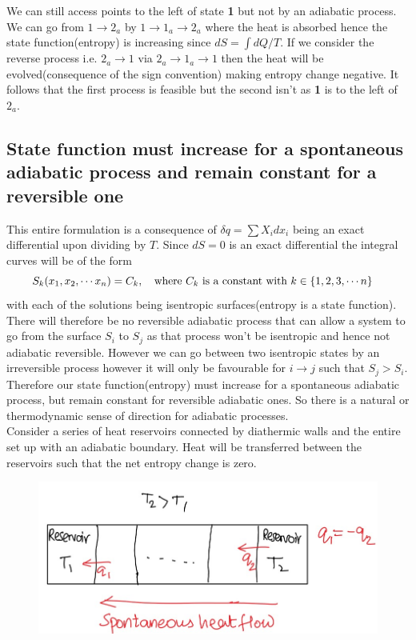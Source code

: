 \documentclass[12pt]{article}
\begin{document}
We can still access points to the left of state \textbf{1} but not by an adiabatic process. We can go from $1\to 2_a$ by $1\to 1_a \to 2_a$ where the heat is absorbed hence the state function(entropy) is increasing since $dS=\int dQ/T$. If we consider the reverse process i.e. $2_a\to 1$ via $2_a\to 1_a\to 1$ then the heat will be evolved(consequence of the sign convention) making entropy change negative. It follows that the first process is feasible but the second isn't as \textbf{1} is to the left of $2_a$.

\subsection{State function must increase for a spontaneous adiabatic process and remain constant for a reversible one} \label{caratheo3}

This entire formulation is a consequence of $\delta q=\sum X_i dx_i$ being an exact differential upon dividing by $T$. Since $dS=0$ is an exact differential the integral curves will be of the form 
\begin{equation}
	S_k(x_1,x_2,\cdots x_n)=C_k, \qq{where $C_k$ is a constant with $k\in \{1, 2, 3,\cdots n\}$}
\end{equation} 
with each of the solutions being isentropic surfaces(entropy is a state function). There will therefore be no reversible adiabatic process that can allow a system to go from the surface $S_i$ to $S_j$ as that process won't be isentropic and hence not adiabatic reversible. However we can go between two isentropic states by an irreversible process however it will only be favourable for $i \to j$ such that $S_j>S_i$. Therefore our state function(entropy) must increase for a spontaneous adiabatic process, but remain constant for reversible adiabatic ones. So there is a natural or thermodynamic sense of direction for adiabatic processes. \\

Consider a series of heat reservoirs connected by diathermic walls and the entire set up with an adiabatic boundary. Heat will be transferred between the reservoirs such that the net entropy change is zero. 

\begin{figure}[h]
	\includegraphics[scale=0.8]{caratheodary3.jpg}
	\centering
\end{figure}
\end{document}
